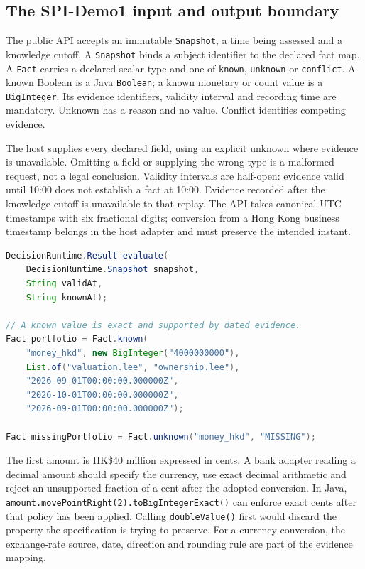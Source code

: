 \documentclass[12pt,a4paper,oneside,openany]{book}
\begin{document}
\subsection{The SPI-Demo1 input and output boundary}
\label{merge:P-03d-java-delivery:02}


The public API accepts an immutable \texttt{Snapshot}, a time being assessed and
a knowledge cutoff. A \texttt{Snapshot} binds a subject identifier to the
declared fact map. A \texttt{Fact} carries a declared scalar type and one of
\texttt{known}, \texttt{unknown} or \texttt{conflict}. A known Boolean is a Java
\texttt{Boolean}; a known monetary or count value is a \texttt{BigInteger}.
Its evidence identifiers, validity interval and recording time are mandatory.
Unknown has a reason and no value. Conflict identifies competing evidence.

The host supplies every declared field, using an explicit unknown where evidence
is unavailable. Omitting a field or supplying the wrong type is a malformed
request, not a legal conclusion. Validity intervals are half-open: evidence
valid until 10:00 does not establish a fact at 10:00. Evidence recorded after
the knowledge cutoff is unavailable to that replay. The API takes canonical UTC
timestamps with six fractional digits; conversion from a Hong Kong business
timestamp belongs in the host adapter and must preserve the intended instant.

\begin{lstlisting}[language=Java,caption={The library API and one dated monetary input.}]
DecisionRuntime.Result evaluate(
    DecisionRuntime.Snapshot snapshot,
    String validAt,
    String knownAt);

// A known value is exact and supported by dated evidence.
Fact portfolio = Fact.known(
    "money_hkd", new BigInteger("4000000000"),
    List.of("valuation.lee", "ownership.lee"),
    "2026-09-01T00:00:00.000000Z",
    "2026-10-01T00:00:00.000000Z",
    "2026-09-01T00:00:00.000000Z");

Fact missingPortfolio = Fact.unknown("money_hkd", "MISSING");
\end{lstlisting}
The first amount is HK\$40 million expressed in cents. A bank adapter reading a
decimal amount should specify the currency, use exact decimal arithmetic and
reject an unsupported fraction of a cent after the adopted conversion. In Java,
\texttt{amount.movePointRight(2).toBigIntegerExact()} can enforce exact cents
after that policy has been applied. Calling \texttt{doubleValue()} first would
discard the property the specification is trying to preserve. For a currency
conversion, the exchange-rate source, date, direction and rounding rule are part
of the evidence mapping.
\end{document}
